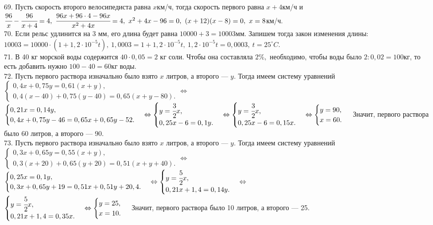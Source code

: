 \documentclass[12pt]{article}
\begin{document}
69. Пусть скорость второго велосипедиста равна $x$км/ч, тогда скорость первого равна $x+4$км/ч и $\cfrac{96}{x}-\cfrac{96}{x+4}=4,\ \cfrac{96x+96\cdot4-96x}{x^2+4x}=4,\ x^2+4x-96=0,\ (x+12)(x-8)=0,\ x=8$км/ч.\\
70. Если рельс удлинится на 3 мм, его длина будет равна $10000+3=10003$мм. Запишем тогда закон изменения длины: $10003=10000\cdot(1+1,2\cdot10^{-5}t),\
1,0003=1+1,2\cdot10^{-5}t,\ 1,2\cdot10^{-5}t=0,0003,\ t=25^\circ C.$\\
71. В 40 кг морской воды содержится $40\cdot0,05=2$ кг соли. Чтобы она составляла $2\%,$ необходимо, чтобы воды было $2:0,02=100$кг, то есть добавить нужно $100-40=60$кг воды.\\
72. Пусть первого раствора изначально было взято $x$ литров, а второго --- $y.$ Тогда имеем систему уравнений $\begin{cases} 0,4x+0,75y=0,61(x+y),\\
0,4(x-40)+0,75(y-40)=0,65(x+y-80).\end{cases}\Leftrightarrow$\\$\begin{cases} 0,21x=0,14y,\\
0,4x+0,75y-46=0,65x+0,65y-52.\end{cases}\Leftrightarrow\begin{cases} y=\cfrac{3}{2}x,\\
0,25x-6=0,1y.\end{cases}\Leftrightarrow\begin{cases} y=\cfrac{3}{2}x,\\
0,25x-6=0,15x.\end{cases}\Leftrightarrow\begin{cases} y=90,\\
x=60.\end{cases}$ Значит, первого раствора было 60 литров, а второго --- 90.\\
73. Пусть первого раствора изначально было взято $x$ литров, а второго --- $y.$ Тогда имеем систему уравнений $\begin{cases} 0,3x+0,65y=0,55(x+y),\\
0,3(x+20)+0,65(y+20)=0,51(x+y+40).\end{cases}\Leftrightarrow$\\$\begin{cases} 0,25x=0,1y,\\
0,3x+0,65y+19=0,51x+0,51y+20,4.\end{cases}\Leftrightarrow\begin{cases} y=\cfrac{5}{2}x,\\
0,21x+1,4=0,14y.\end{cases}\Leftrightarrow$\\$\begin{cases} y=\cfrac{5}{2}x,\\
0,21x+1,4=0,35x.\end{cases}\Leftrightarrow\begin{cases} y=25,\\
x=10.\end{cases}$ Значит, первого раствора было 10 литров, а второго --- 25.\\
\end{document}
